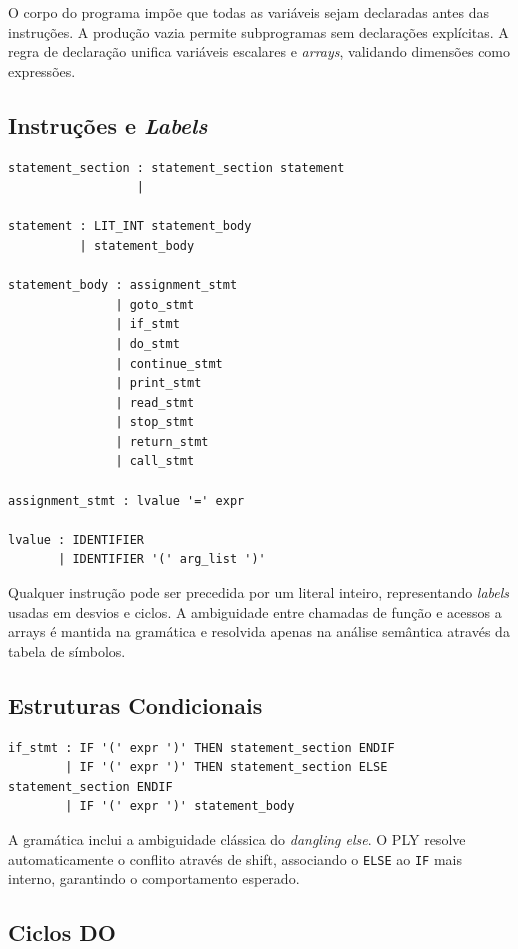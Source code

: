 \documentclass[11pt, a4paper, fleqn]{article}
\begin{document}
\noindent O corpo do programa impõe que todas as variáveis sejam declaradas antes das instruções. A produção vazia permite subprogramas sem declarações explícitas. A regra de declaração unifica variáveis escalares e \textit{arrays}, validando dimensões como expressões.

\subsection{Instruções e \textit{Labels}}

\begin{lstlisting}
statement_section : statement_section statement
                  |

statement : LIT_INT statement_body
          | statement_body

statement_body : assignment_stmt
               | goto_stmt
               | if_stmt
               | do_stmt
               | continue_stmt
               | print_stmt
               | read_stmt
               | stop_stmt
               | return_stmt
               | call_stmt

assignment_stmt : lvalue '=' expr

lvalue : IDENTIFIER
       | IDENTIFIER '(' arg_list ')'
\end{lstlisting}

\noindent Qualquer instrução pode ser precedida por um literal inteiro, representando \textit{labels} usadas em desvios e ciclos. A ambiguidade entre chamadas de função e acessos a arrays é mantida na gramática e resolvida apenas na análise semântica através da tabela de símbolos.

\subsection{Estruturas Condicionais}

\begin{lstlisting}
if_stmt : IF '(' expr ')' THEN statement_section ENDIF
        | IF '(' expr ')' THEN statement_section ELSE statement_section ENDIF
        | IF '(' expr ')' statement_body
\end{lstlisting}

\noindent A gramática inclui a ambiguidade clássica do \textit{dangling else}. O PLY resolve automaticamente o conflito através de shift, associando o \texttt{ELSE} ao \texttt{IF} mais interno, garantindo o comportamento esperado.

\newpage

\subsection{Ciclos DO}
\end{document}
